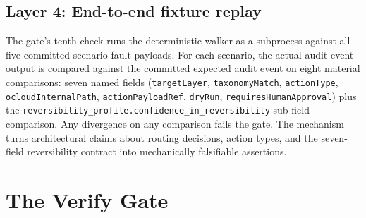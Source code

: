 \documentclass[twocolumn,10pt,a4paper]{article}
\begin{document}
\subsection{Layer 4: End-to-end fixture replay}

The gate's tenth check runs the deterministic walker as a subprocess against all five committed scenario fault payloads. For each scenario, the actual audit event output is compared against the committed expected audit event on eight material comparisons: seven named fields (\texttt{targetLayer}, \texttt{taxonomyMatch}, \texttt{actionType}, \texttt{ocloudInternalPath}, \texttt{actionPayloadRef}, \texttt{dryRun}, \texttt{requiresHumanApproval}) plus the \texttt{reversibility\_profile.confidence\_in\_reversibility} sub-field comparison. Any divergence on any comparison fails the gate. The mechanism turns architectural claims about routing decisions, action types, and the seven-field reversibility contract into mechanically falsifiable assertions.

\section{The Verify Gate}
\label{sec:gate}
\end{document}
